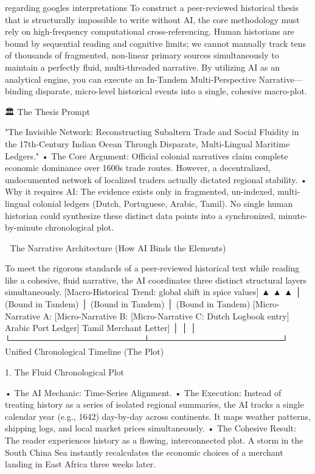 regarding  googles interpretations To construct a peer-reviewed historical thesis that is structurally impossible to write without AI, the core methodology must rely on high-frequency computational cross-referencing.
Human historians are bound by sequential reading and cognitive limits; we cannot manually track tens of thousands of fragmented, non-linear primary sources simultaneously to maintain a perfectly fluid, multi-threaded narrative. By utilizing AI as an analytical engine, you can execute an In-Tandem Multi-Perspective Narrative—binding disparate, micro-level historical events into a single, cohesive macro-plot.

🏛️ The Thesis Prompt

"The Invisible Network: Reconstructing Subaltern Trade and Social Fluidity in the 17th-Century Indian Ocean Through Disparate, Multi-Lingual Maritime Ledgers."
• The Core Argument: Official colonial narratives claim complete economic dominance over 1600s trade routes. However, a decentralized, undocumented network of localized traders actually dictated regional stability.
• Why it requires AI: The evidence exists only in fragmented, un-indexed, multi-lingual colonial ledgers (Dutch, Portuguese, Arabic, Tamil). No single human historian could synthesize these distinct data points into a synchronized, minute-by-minute chronological plot.

🧵 The Narrative Architecture (How AI Binds the Elements)

To meet the rigorous standards of a peer-reviewed historical text while reading like a cohesive, fluid narrative, the AI coordinates three distinct structural layers simultaneously.
[Macro-Historical Trend: global shift in spice values]
       ▲                      ▲                      ▲
       │ (Bound in Tandem)    │ (Bound in Tandem)    │ (Bound in Tandem)
[Micro-Narrative A:           [Micro-Narrative B:    [Micro-Narrative C:
 Dutch Logbook entry]          Arabic Port Ledger]    Tamil Merchant Letter]
       │                      │                      │
       └──────────────────────┴──────────────────────┘
            Unified Chronological Timeline (The Plot)

1. The Fluid Chronological Plot

• The AI Mechanic: Time-Series Alignment.
• The Execution: Instead of treating history as a series of isolated regional summaries, the AI tracks a single calendar year (e.g., 1642) day-by-day across continents. It maps weather patterns, shipping logs, and local market prices simultaneously.
• The Cohesive Result: The reader experiences history as a flowing, interconnected plot. A storm in the South China Sea instantly recalculates the economic choices of a merchant landing in East Africa three weeks later.

